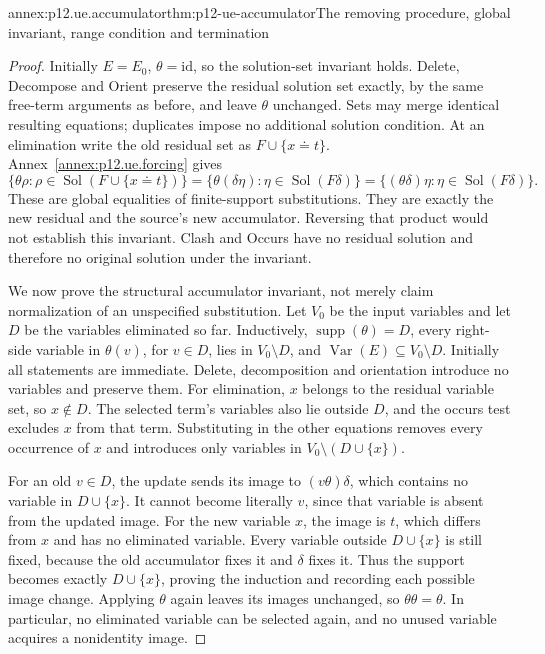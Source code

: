 \begin{annexitem}{annex:p12.ue.accumulator}{thm:p12-ue-accumulator}{The removing procedure, global invariant, range condition and termination}
\begin{proof}
Initially \(E=E_0\), \(\theta=\mathrm{id}\), so the solution-set
invariant holds. Delete, Decompose and Orient preserve the residual
solution set exactly, by the same free-term arguments as before, and
leave \(\theta\) unchanged. Sets may merge identical resulting equations;
duplicates impose no additional solution condition. At an elimination
write the old residual set as \(F\cup\{x\doteq t\}\).
Annex~\ref{annex:p12.ue.forcing} gives
\[
 \{\theta\rho:\rho\in\operatorname{Sol}(F\cup\{x\doteq t\})\}
 =\{\theta(\delta\eta):\eta\in\operatorname{Sol}(F\delta)\}
 =\{(\theta\delta)\eta:\eta\in\operatorname{Sol}(F\delta)\}.
\]
These are global equalities of finite-support substitutions. They are
exactly the new residual and the source's new accumulator. Reversing
that product would not establish this invariant. Clash and Occurs have
no residual solution and therefore no original solution under the invariant.

We now prove the structural accumulator invariant, not merely claim
normalization of an unspecified substitution. Let \(V_0\) be the input
variables and let \(D\) be the variables eliminated so far. Inductively,
\(\operatorname{supp}(\theta)=D\), every right-side variable in
\(\theta(v)\), for \(v\in D\), lies in \(V_0\setminus D\),
and \(\operatorname{Var}(E)\subseteq V_0\setminus D\).
Initially all statements are immediate. Delete, decomposition and
orientation introduce no variables and preserve them. For elimination,
\(x\) belongs to the residual variable set, so \(x\notin D\).
The selected term's variables also lie outside \(D\), and the occurs
test excludes \(x\) from that term. Substituting in the other equations
removes every occurrence of \(x\) and introduces only variables in
\(V_0\setminus(D\cup\{x\})\).

For an old \(v\in D\), the update sends its image to
\((v\theta)\delta\), which contains no variable in
\(D\cup\{x\}\). It cannot become literally \(v\), since that
variable is absent from the updated image. For the new variable \(x\),
the image is \(t\), which differs from \(x\) and has no eliminated
variable. Every variable outside \(D\cup\{x\}\) is still fixed,
because the old accumulator fixes it and \(\delta\) fixes it.
Thus the support becomes exactly \(D\cup\{x\}\), proving the
induction and recording each possible image change. Applying \(\theta\)
again leaves its images unchanged, so \(\theta\theta=\theta\).
In particular, no eliminated variable can be selected again, and no
unused variable acquires a nonidentity image.


\end{proof}
\end{annexitem}
